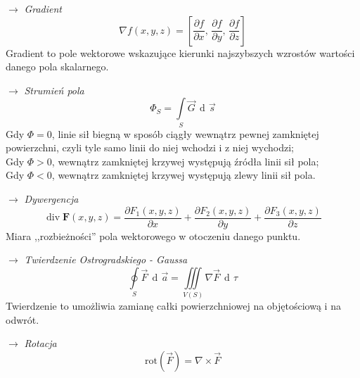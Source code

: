 \documentclass[12pt]{article}
\newenvironment{wzor}[1]{\par{\Large $\longrightarrow$ \textit{#1}}}
    {\newline {\color{grey} \rule{\linewidth}{0.3pt}}}
\DeclareMathOperator{\der}{\operatorname{d}\!}
\begin{document}

\begin{wzor}{Gradient}
    \begin{equation}
        \nabla f(x,y,z) = \left[
                \frac{\partial f}{\partial x},\,
                \frac{\partial f}{\partial y},\,
                \frac{\partial f}{\partial z}
        \right]
    \end{equation}
    Gradient to pole wektorowe wskazujące kierunki najszybszych wzrostów wartości
    danego pola skalarnego.
\end{wzor}

\begin{wzor}{Strumień pola}
    \begin{equation}
        \Phi_S = \int\limits_S \Vec{G} \, \der \Vec{s}
    \end{equation}
    Gdy $\Phi = 0$, linie sił biegną w sposób ciągły wewnątrz pewnej zamkniętej powierzchni,
    czyli tyle samo linii do niej wchodzi i z niej wychodzi;\\
    Gdy $\Phi > 0$, wewnątrz zamkniętej krzywej występują źródła linii sił pola;\\
    Gdy $\Phi < 0$, wewnątrz zamkniętej krzywej występują zlewy linii sił pola.
\end{wzor}

\begin{wzor}{Dywergencja}
    \begin{equation}
        \operatorname{div} \mathbf{F}(x,y,z) = \frac{\partial F_1(x,y,z)}{\partial x}
                + \frac{\partial F_2(x,y,z)}{\partial y}
                + \frac{\partial F_3(x,y,z)}{\partial z}
    \end{equation}
    Miara ,,rozbieżności'' pola wektorowego w otoczeniu danego punktu.
\end{wzor}

\begin{wzor}{Twierdzenie Ostrogradskiego - Gaussa}
    \begin{equation}
        \oint\limits_S \Vec{F} \, \der \Vec{a} = \iiint\limits_{V(S)} \nabla \Vec{F} \, \der\tau
    \end{equation}
    Twierdzenie to umożliwia zamianę całki powierzchniowej na objętościową i na odwrót.
\end{wzor}

\begin{wzor}{Rotacja}
    \begin{equation}
        \mathrm{rot}(\Vec{F}) = \nabla \times \Vec{F}
    \end{equation}
\end{wzor}
\end{document}
